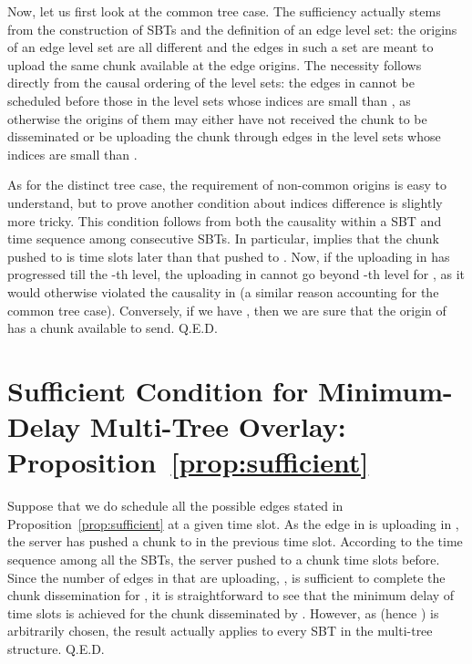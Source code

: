 \documentclass[conference]{IEEEtran}
\begin{document}
  Now, let us first look at the common tree case. The sufficiency actually stems from the construction of SBTs and the definition of an edge level set: the origins of an edge level set are all different and the edges in such a set are meant to upload the same chunk available at the edge origins. The necessity follows directly from the causal ordering of the level sets: the edges in  cannot be scheduled before those in the level sets whose indices are small than , as otherwise the origins of them may either have not received the chunk to be disseminated or be uploading the chunk through edges in the level sets whose indices are small than .

  As for the distinct tree case, the requirement of non-common origins is easy to understand, but to prove another condition about indices difference is slightly more tricky. This condition follows from both the causality within a SBT and time sequence among consecutive SBTs. In particular,  implies that the chunk pushed to  is  time slots later than that pushed to . Now, if the uploading in  has progressed till the -th level, the uploading in  cannot go beyond -th level for , as it would otherwise violated the causality in  (a similar reason accounting for the common tree case). Conversely, if we have , then we are sure that the origin of  has a chunk available to send. \hfill Q.E.D.

\section{Sufficient Condition for Minimum-Delay Multi-Tree Overlay: Proposition~\ref{prop:sufficient}} \label{sec:mdmtree}
Suppose that we do schedule all the possible edges stated in Proposition~\ref{prop:sufficient} at a given time slot. As the edge in  is uploading in , the server has pushed a chunk to  in the previous time slot. According to the time sequence among all the SBTs, the server pushed to  a chunk  time slots before. Since the number of edges in  that are uploading, , is sufficient to complete the chunk dissemination for , it is straightforward to see that the minimum delay of  time slots is achieved for the chunk disseminated by . However, as  (hence ) is arbitrarily chosen, the result actually applies to every SBT in the multi-tree structure. \hfill Q.E.D.

\vfill\eject
\end{document}
